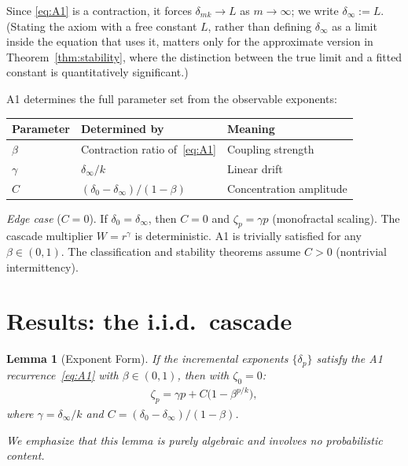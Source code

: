 \documentclass[pdflatex,sn-mathphys-num]{sn-jnl}
\theoremstyle{thmstyleone}
\newtheorem{lemma}[theorem]{Lemma}
\theoremstyle{thmstyletwo}
\theoremstyle{thmstylethree}
\begin{document}
Since \eqref{eq:A1} is a contraction, it forces
$\delta_{mk} \to L$ as $m \to \infty$; we write
$\delta_\infty := L$.  (Stating the axiom with a free constant $L$,
rather than defining $\delta_\infty$ as a limit inside the equation
that uses it, matters only for the approximate version in
Theorem~\ref{thm:stability}, where the distinction between the true
limit and a fitted constant is quantitatively significant.)

A1 determines the full parameter set from the observable exponents:
\begin{center}\small
\begin{tabular}{@{}lll@{}}
\toprule
Parameter & Determined by & Meaning \\
\midrule
$\beta$ & Contraction ratio of~\eqref{eq:A1} & Coupling strength \\
$\gamma$ & $\delta_\infty / k$ & Linear drift \\
$C$ & $(\delta_0 - \delta_\infty)/(1 - \beta)$ & Concentration amplitude \\
\bottomrule
\end{tabular}
\end{center}

\smallskip\noindent\textit{Edge case} ($C = 0$).  If $\delta_0 =
\delta_\infty$, then $C = 0$ and $\zeta_p = \gamma p$ (monofractal
scaling).  The cascade multiplier $W = r^\gamma$ is deterministic.
A1 is trivially satisfied for any $\beta \in (0,1)$.  The
classification and stability theorems assume $C > 0$ (nontrivial
intermittency).


\section{Results: the i.i.d.\ cascade}
\label{sec:results}


\begin{lemma}[Exponent Form]\label{lem:exponent}
If the incremental exponents $\{\delta_p\}$ satisfy the A1
recurrence~\eqref{eq:A1} with $\beta \in (0,1)$, then with $\zeta_0
= 0$:
\begin{align}\label{eq:zeta}
  \zeta_p = \gamma p + C\bigl(1 - \beta^{p/k}\bigr),
  \tag{$**$}
\end{align}
where $\gamma = \delta_\infty / k$ and $C = (\delta_0 -
\delta_\infty)/(1 - \beta)$.

We emphasize that this lemma is purely algebraic and involves no
probabilistic content.
\end{lemma}
\end{document}
